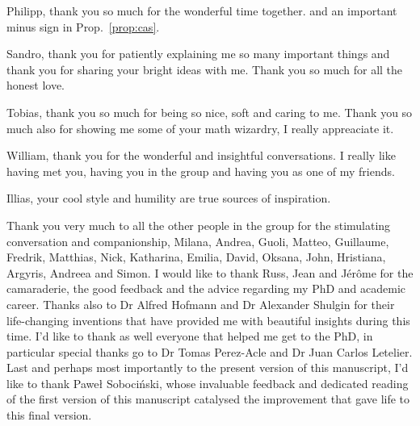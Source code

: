 \documentclass[phd,lfcs]{infthesis}
\newcommand{\prop}[1]{Prop.~\ref{prop:#1}}
\begin{document}
\begin{preliminary}
\begin{acknowledgements}
  Philipp, thank you so much for the wonderful time together.
  and an important minus sign in \prop{cas}.

  Sandro, thank you for patiently explaining me so many important things
  and thank you for sharing your bright ideas with me.
  Thank you so much for all the honest love.

  Tobias, thank you so much for being so nice, soft and caring to me. %
  Thank you so much also for showing me some of your math wizardry,
  I really appreaciate it.

  William, thank you for the wonderful and insightful conversations. %
  I really like having met you, having you in the group
  and having you as one of my friends.

  Illias, your cool style and humility are true sources of inspiration.

  Thank you very much to all the other people in the group
  for the stimulating conversation and companionship,
  Milana, Andrea, Guoli, Matteo, Guillaume, Fredrik, Matthias, Nick,
  Katharina, Emilia, David, Oksana, John, Hristiana,
  Argyris, Andreea and Simon.
  I would like to thank Russ, Jean and J\'er\^ome
  for the camaraderie, the good feedback and
  the advice regarding my PhD and academic career.
  Thanks also to Dr Alfred Hofmann and Dr Alexander Shulgin
  for their life-changing inventions that have provided me
  with beautiful insights during this time.
  I'd like to thank as well everyone that helped me get to the PhD,
  in particular special thanks go to Dr Tomas Perez-Acle
  and Dr Juan Carlos Letelier. %
  Last and perhaps most importantly to the present version
  of this manuscript, I'd like to thank Paweł Sobociński,
  whose invaluable feedback and dedicated reading of the first
  version of this manuscript catalysed %
  the improvement that gave life to this final version.
  \fi
\end{acknowledgements}

\standarddeclaration


\tableofcontents


\end{preliminary}
\end{document}
